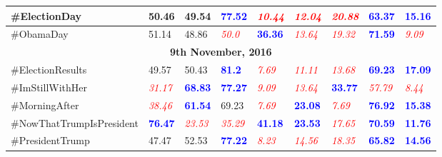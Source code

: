 \documentclass[letterpaper]{article}
\begin{document}
\begin{table*}[t]
\begin{tabular}{|p{}|p{}|p{}||p{}|p{}|p{}||p{}|p{}|p{}|}
\hline
\#ElectionDay & 50.46 & 49.54 &  \textcolor{blue}{\bf 77.52} & \textcolor{red}{\it 10.44} & \textcolor{red}{\it 12.04} &  \textcolor{red}{\it 20.88} & \textcolor{blue}{\bf 63.37} & \textcolor{blue}{\bf 15.16} \\
\hline
\#ObamaDay & 51.14 & 48.86 &  \textcolor{red}{\it 50.0} & \textcolor{blue}{\bf 36.36} & \textcolor{red}{\it 13.64} &  \textcolor{red}{\it 19.32} & \textcolor{blue}{\bf 71.59} & \textcolor{red}{\it 9.09} \\
\hline
\hline
\multicolumn{9}{|c|}{\bf 9th November, 2016} \\
\hline
\#ElectionResults & 49.57 & 50.43 &  \textcolor{blue}{\bf 81.2} & \textcolor{red}{\it 7.69} & \textcolor{red}{\it 11.11} &  \textcolor{red}{\it 13.68} & \textcolor{blue}{\bf 69.23} & \textcolor{blue}{\bf 17.09} \\
\hline
\#ImStillWithHer & \textcolor{red}{\it 31.17} & \textcolor{blue}{\bf 68.83} &  \textcolor{blue}{\bf 77.27} & \textcolor{red}{\it 9.09} & \textcolor{red}{\it 13.64} &  \textcolor{blue}{\bf 33.77} & \textcolor{red}{\it 57.79} & \textcolor{red}{\it 8.44}  \\
\hline
\#MorningAfter & \textcolor{red}{\it 38.46} & \textcolor{blue}{\bf 61.54} & 69.23 & \textcolor{red}{\it 7.69} & \textcolor{blue}{\bf 23.08} &  \textcolor{red}{\it 7.69} & \textcolor{blue}{\bf 76.92} & \textcolor{blue}{\bf 15.38}  \\
\hline
\#NowThatTrumpIsPresident & \textcolor{blue}{\bf 76.47} & \textcolor{red}{\it 23.53} &  \textcolor{red}{\it 35.29} & \textcolor{blue}{\bf 41.18} & \textcolor{blue}{\bf 23.53} &  \textcolor{red}{\it 17.65} & \textcolor{blue}{\bf 70.59} & \textcolor{blue}{\bf 11.76} \\
\hline
\#PresidentTrump & 47.47 & 52.53 &  \textcolor{blue}{\bf 77.22} & \textcolor{red}{\it 8.23} & \textcolor{red}{\it 14.56} &  \textcolor{red}{\it 18.35} & \textcolor{blue}{\bf 65.82} & \textcolor{blue}{\bf 14.56}  \\

\end{tabular}
\end{table*}
\end{document}

